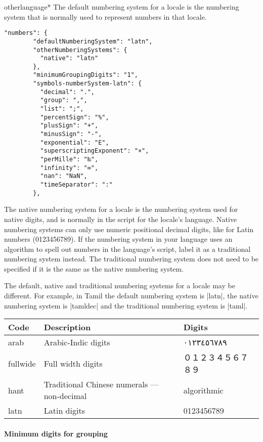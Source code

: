 \begin{docCommandd}{otherlanguage*} { }
The default numbering system for a locale is the numbering system that is normally used to represent numbers in that locale.

\begin{verbatim}
"numbers": {
        "defaultNumberingSystem": "latn",
        "otherNumberingSystems": {
          "native": "latn"
        },
        "minimumGroupingDigits": "1",
        "symbols-numberSystem-latn": {
          "decimal": ".",
          "group": ",",
          "list": ";",
          "percentSign": "%",
          "plusSign": "+",
          "minusSign": "-",
          "exponential": "E",
          "superscriptingExponent": "×",
          "perMille": "‰",
          "infinity": "∞",
          "nan": "NaN",
          "timeSeparator": ":"
        },
\end{verbatim}

The native numbering system for a locale is the numbering system used for native digits, and is normally in the script for the locale's language. Native numbering systems can only use numeric positional decimal digits, like for Latin numbers (0123456789). If the numbering system in your language uses an algorithm to spell out numbers in the language's script, label it as a traditional numbering system instead. The traditional numbering system does not need to be specified if it is the same as the native numbering system.

The default, native and traditional numbering systems for a locale may be different. For example, in Tamil the default numbering system is |latn|, the native numbering system is |tamldec| and the traditional numbering system is |taml|.

\begin{trivlist}\item[]
\begin{tabular}{lll}
\toprule
Code	 & Description	 & Digits\\
\midrule
arab	 & Arabic-Indic digits	&\panunicode ٠١٢٣٤٥٦٧٨٩\\
fullwide &   	Full width digits &\panunicode 	０１２３４５６７８９\\
hant	   & Traditional Chinese numerals — non-decimal	& algorithmic\\
latn	   &Latin digits	 &0123456789\\
\bottomrule
\end{tabular}
\end{trivlist}

\paragraph{Minimum digits for grouping}


\end{docCommandd}
